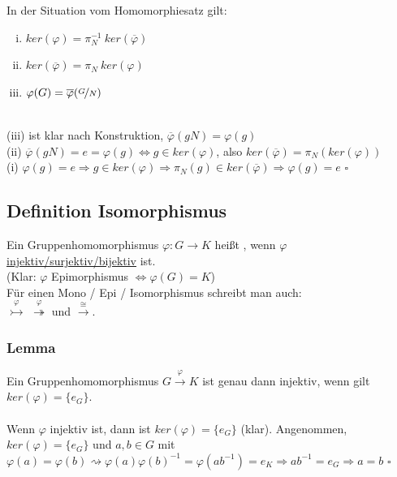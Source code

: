 In der Situation vom Homomorphiesatz gilt:
\begin{enumerate}[(i)]
	\item $ker(\varphi)=\pi_N^{-1}~ker(\overline{\varphi})$
	\item $ker(\overline{\varphi})=\pi_N~ker(\varphi)$
	\item $\varphi(G)=\overline{\varphi}(\nicefrac{G}{N})$
\end{enumerate}
\\
(iii) ist klar nach Konstruktion, $\overline{\varphi}(gN)=\varphi(g)$\\
(ii) $\overline{\varphi}(gN)=e=\varphi(g) \Leftrightarrow g \in ker(\varphi)$, also $ker(\overline{\varphi})=\pi_N(ker(\varphi))$\\
(i) $\varphi(g)=e \Rightarrow g \in ker(\varphi) \Rightarrow\pi_N(g) \in ker(\overline{\varphi}) \Rightarrow \varphi(g)=e$
\hfill $\square$


\subsection{Definition Isomorphismus}
\label{sub:def_isomorph}
Ein Gruppenhomomorphismus $\varphi:G \to K$ heißt , wenn $\varphi$ \uline{injektiv/surjektiv/bijektiv} ist.\\
(Klar: $\varphi$ Epimorphismus $\Leftrightarrow \varphi(G)=K$)\\
Für einen Mono / Epi / Isomorphismus schreibt man auch: \\
$\stackrel{\varphi}{\rightarrowtail}$  $\stackrel{\varphi}{\twoheadrightarrow}$  und  $\stackrel{\cong}{\to}$.

\subsubsection*{Lemma}
Ein Gruppenhomomorphismus $G \stackrel{\varphi}{\to}K$ ist genau dann injektiv, wenn gilt $ker(\varphi)=\{e_G\}$.\\

\\
Wenn $\varphi$ injektiv ist, dann ist $ker(\varphi)=\{e_G\}$ (klar). Angenommen, $ker(\varphi)=\{e_G\}$ und $a,b\in G$ mit $\varphi(a)=\varphi(b) \rightsquigarrow \varphi(a)\varphi(b)^{-1}=\varphi(ab^{-1})=e_K \Rightarrow ab^{-1}=e_G \Rightarrow a=b$
\hfill $\square$


